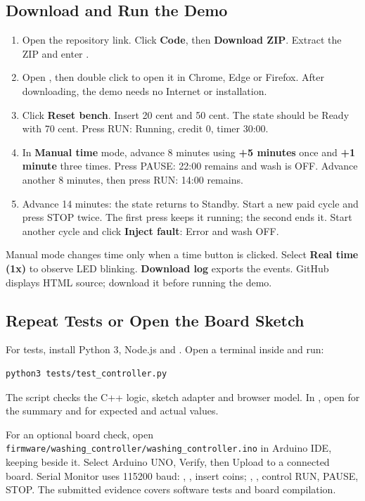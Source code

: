 \subsection{Download and Run the Demo}
\begin{enumerate}
\item Open the repository link. Click \textbf{Code}, then \textbf{Download ZIP}.
Extract the ZIP and enter .
\item Open , then double click
 to open it in Chrome, Edge or Firefox.
After downloading, the demo needs no Internet or installation.
\item Click \textbf{Reset bench}. Insert 20 cent and 50 cent. The state should
be Ready with 70 cent. Press RUN: Running, credit 0, timer 30:00.
\item In \textbf{Manual time} mode, advance 8 minutes using \textbf{+5 minutes} once and
\textbf{+1 minute} three times. Press PAUSE: 22:00 remains and wash is OFF.
Advance another 8 minutes, then press RUN: 14:00 remains.
\item Advance 14 minutes: the state returns to Standby. Start a new paid
cycle and press STOP twice. The first press keeps it running; the second ends it.
Start another cycle and click \textbf{Inject fault}: Error and wash OFF.
\end{enumerate}
Manual mode changes time only when a time button is clicked. Select
\textbf{Real time (1x)} to observe LED blinking. \textbf{Download log} exports
the events. GitHub displays HTML source; download it before running the demo.

\subsection{Repeat Tests or Open the Board Sketch}
For tests, install Python 3, Node.js and . Open a terminal inside
 and run:
\begin{lstlisting}[language={},aboveskip=3pt,belowskip=3pt]
python3 tests/test_controller.py
\end{lstlisting}
The script checks the C++ logic, sketch adapter and browser model. In
, open  for the summary and
 for expected and actual values.

For an optional board check, open
\nolinkurl{firmware/washing_controller/washing_controller.ino} in Arduino IDE,
keeping  beside it. Select Arduino UNO, Verify, then Upload
to a connected board. Serial Monitor uses 115200 baud: , ,
 insert coins; , ,  control RUN, PAUSE, STOP.
The submitted evidence covers software tests and board compilation.
